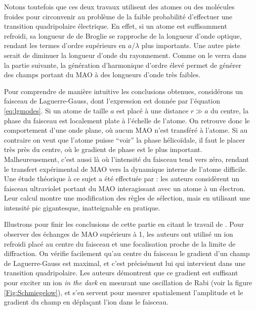Notons toutefois que ces deux travaux utilisent des atomes ou des molécules froides pour circonvenir au problème de la faible probabilité d'effectuer une transition quadripolaire électrique. En effet, si un atome est suffisamment refroidi, sa longueur de de Broglie se rapproche de la longueur d'onde optique, rendant les termes d'ordre supérieurs en $a/\lambda$ plus importants.  Une autre piste serait de diminuer la longueur d'onde du rayonnement. Comme on le verra dans la partie suivante, la génération d'harmonique d'ordre élevé permet de générer des champs portant du MAO à des longueurs d'onde très faibles.%

Pour comprendre de manière intuitive les conclusions obtenues, considérons un faisceau de Laguerre-Gauss, dont l'expression est donnée par l'équation \ref{eq:lgmodes}. Si un atome de taille $a$ est placé à une distance $r\gg a$ du centre, la phase du faisceau est localement plate à l'échelle de l'atome. On retrouve donc le comportement d'une onde plane, où aucun MAO n'est transféré à l'atome. Si au contraire on veut que l'atome puisse ``voir'' la phase hélicoïdale, il faut le placer très près du centre, où le gradient de phase est le plus important. Malheureusement, c'est aussi là où l'intensité du faisceau tend vers zéro, rendant le transfert expérimental de MAO vers la dynamique interne de l'atome difficile. Une étude théorique à ce sujet a été effectuée par  : les auteurs considèrent un faisceau ultraviolet portant du MAO interagissant avec un atome à un électron. Leur calcul montre une modification des règles de sélection, mais en utilisant une intensité pic gigantesque, inatteignable en pratique.

Illustrons pour finir les conclusions de cette partie en citant le travail de . Pour observer des échanges de MAO supérieurs à 1, les auteurs ont utilisé un ion refroidi placé au centre du faisceau et une focalisation proche de la limite de diffraction. On vérifie facilement qu'au centre du faisceau le gradient d'un champ de Laguerre-Gauss est maximal, et c'est précisément lui qui intervient dans une transition quadripolaire. Les auteurs démontrent que ce gradient est suffisant pour exciter un ion \textit{in the dark} en mesurant une oscillation de Rabi (voir la figure \ref{Fig:Schmiegelow}), et s'en servent pour mesurer spatialement l'amplitude et le gradient du champ en déplaçant l'ion dans le faisceau.
\newpage

